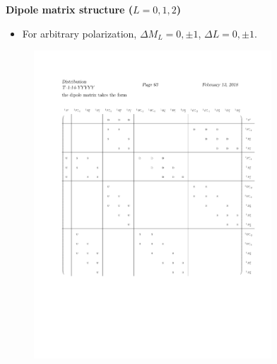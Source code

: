 \documentclass{fancyslides}
\newlength{\wideitemsep}
\let\olditem\item
\renewcommand{\item}{\setlength{\itemsep}{\wideitemsep}\olditem}
\begin{document}
\begin{frame}

\begin{center}
{\bf\large Dipole matrix structure ($L=0,1,2$)}
\end{center}
\begin{itemize}
\item
For arbitrary polarization, $\Delta M_L = 0,\pm1$, $\Delta L=0,\pm1$.
\end{itemize}
\vspace{-0.2in}


\begin{figure}[h]
\centering\includegraphics[width=3.5in]{matrix.pdf}%
\end{figure}

\end{frame}
\end{document}
